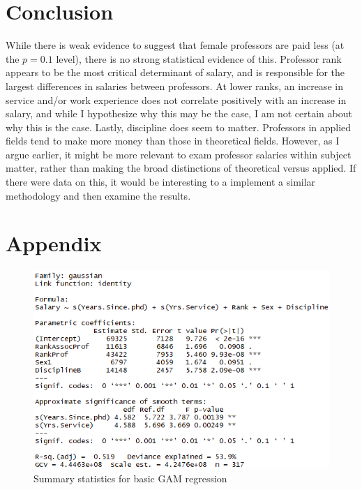 \documentclass{article}
\begin{document}
\newpage

\section{Conclusion}

While there is weak evidence to suggest that female professors are paid less (at the $p=0.1$ level), there is no strong statistical evidence of this. Professor rank appears to be the most critical determinant of salary, and is responsible for the largest differences in salaries between professors. At lower ranks, an increase in service and/or work experience does not correlate positively with an increase in salary, and while I hypothesize why this may be the case, I am not certain about why this is the case. Lastly, discipline does seem to matter. Professors in applied fields tend to make more money than those in theoretical fields. However, as I argue earlier, it might be more relevant to exam professor salaries within subject matter, rather than making the broad distinctions of theoretical versus applied. If there were data on this, it would be interesting to a implement a similar methodology and then examine the results. 


\section{Appendix}

\begin{figure}[!htb]
    \centering
    \includegraphics{gam1summary}
    \caption{Summary statistics for basic GAM regression}
    \label{gam1sum}
\end{figure}

\newpage
\end{document}
